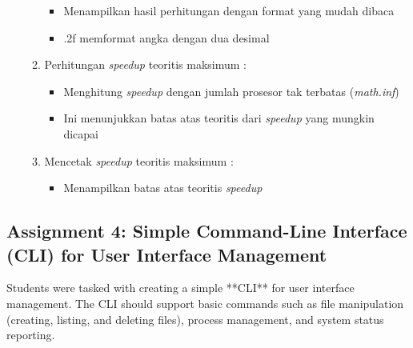 \documentclass[12pt]{article}
\begin{document}
\begin{enumerate}
\begin{enumerate}
\begin{itemize}
                \item Menampilkan hasil perhitungan dengan format yang mudah dibaca
                \item .2f memformat angka dengan dua desimal
            \end{itemize}
        \item  Perhitungan \textit{speedup} teoritis maksimum :
            \begin{itemize}
                \item Menghitung \textit{speedup} dengan jumlah prosesor tak terbatas (\textit{math.inf})
                \item Ini menunjukkan batas atas teoritis dari \textit{speedup} yang mungkin dicapai
            \end{itemize}
        \item Mencetak \textit{speedup} teoritis maksimum :
            \begin{itemize}
                \item Menampilkan batas atas teoritis \textit{speedup}
            \end{itemize}


    \end{enumerate}
\end{enumerate}

\subsection{Assignment 4: Simple Command-Line Interface (CLI) for User Interface Management}
Students were tasked with creating a simple **CLI** for user interface management. The CLI should support basic commands such as file manipulation (creating, listing, and deleting files), process management, and system status reporting.
\end{document}
